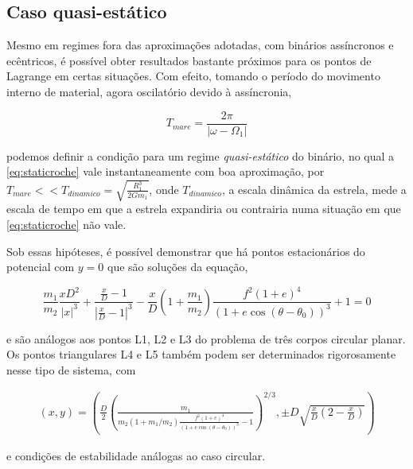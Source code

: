 \subsection{Caso quasi-estático}

Mesmo em regimes fora das aproximações adotadas, com binários assíncronos e ecêntricos, é possível obter resultados bastante próximos para os pontos de Lagrange em certas situações. Com efeito, tomando o período do movimento interno de material, agora oscilatório devido à assíncronia,

\begin{equation}
    T_{mare} = \frac{2\pi}{|\omega - \Omega_1|}
\end{equation}

podemos definir a condição para um regime \textit{quasi-estático} do binário, no qual a \ref{eq:staticroche} vale instantaneamente com boa aproximação, por $T_{mare} << T_{dinamico} = \sqrt{\frac{R_1^3}{2Gm_1}}$, onde $T_{dinamico} $, a escala dinâmica da estrela, mede a escala de tempo em que a estrela expandiria ou contrairia numa situação em que \ref{eq:staticroche} não vale.

Sob essas hipóteses, é possível demonstrar \cite{nonsyncbin} que há pontos estacionários do potencial com $y = 0$ que são soluções da equação,

\begin{equation}
    \frac{m_1}{m_2}\frac{xD^2}{|x|^3}+\frac{\frac{x}{D}-1}{|\frac{x}{D}-1|^3}-\frac{x}{D}\left(1+\frac{m_1}{m_2}\right)\frac{f^2(1+e)^4}{(1+e\cos(\theta - \theta_0))^3}+1=0
\end{equation}

e são análogos aos pontos L1, L2 e L3 do problema de três corpos circular planar. Os pontos triangulares L4 e L5 também podem ser determinados rigorosamente nesse tipo de sistema, com

\begin{align}
    (x, y) = \left(\frac{D}{2}\left(\frac{m_1}{m_2(1 + m_1/m_2)\frac{f^2(1+e)^4}{(1+e\cos(\theta - \theta_0))^3} - 1}\right)^{2/3},\pm D\sqrt{\frac{x}{D}\left(2 - \frac{x}{D}\right)}\right)
\end{align}

e condições de estabilidade análogas ao caso circular.